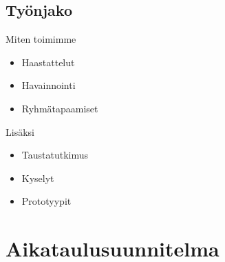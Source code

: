 \documentclass{beamer}
\begin{document}
\subsection{Työnjako}

\begin{frame}{Miten toimimme}

	\begin{itemize}
		\item <2-> Haastattelut
		\item <3-> Havainnointi
		\item <4-> Ryhmätapaamiset
	\end{itemize}

 Lisäksi

	\begin{itemize}
		\item<6-> Taustatutkimus
		\item<7-> Kyselyt
		\item<8-> Prototyypit
	\end{itemize}

\end{frame}


\section{Aikataulu\-suunnitelma}
\end{document}
